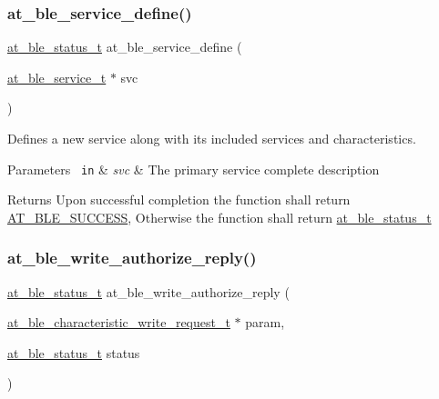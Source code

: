 \subsubsection{\texorpdfstring{at\_ble\_service\_define()}{at\_ble\_service\_define()}}
{\footnotesize\ttfamily \mbox{\hyperlink{group__error__codes__group_ga3b1db9b95feb157b3c188ca27fe76988}{at\+\_\+ble\+\_\+status\+\_\+t}} at\+\_\+ble\+\_\+service\+\_\+define (\begin{DoxyParamCaption}\item[{\mbox{\hyperlink{structat__ble__service__t}{at\+\_\+ble\+\_\+service\+\_\+t}} $\ast$}]{svc }\end{DoxyParamCaption})}



Defines a new service along with its included services and characteristics. 


\begin{DoxyParams}[1]{Parameters}
\mbox{\texttt{ in}}  & {\em svc} & The primary service complete description\\
\hline
\end{DoxyParams}
\begin{DoxyReturn}{Returns}
Upon successful completion the function shall return \mbox{\hyperlink{group__error__codes__group_gga3b1db9b95feb157b3c188ca27fe76988a7e3bfff5387331cd4f2c56cbcbbd7e19}{A\+T\+\_\+\+B\+L\+E\+\_\+\+S\+U\+C\+C\+E\+SS}}, Otherwise the function shall return \mbox{\hyperlink{at__ble__api_8h_ace24eb4e5ca3f325c663b809da5feb92}{at\+\_\+ble\+\_\+status\+\_\+t}} 
\end{DoxyReturn}
\mbox{\label{group__gatt__server__group_gaf68dba9223f2fd2828ec74ce9a9f9f8e}} 
\subsubsection{\texorpdfstring{at\_ble\_write\_authorize\_reply()}{at\_ble\_write\_authorize\_reply()}}
{\footnotesize\ttfamily \mbox{\hyperlink{group__error__codes__group_ga3b1db9b95feb157b3c188ca27fe76988}{at\+\_\+ble\+\_\+status\+\_\+t}} at\+\_\+ble\+\_\+write\+\_\+authorize\+\_\+reply (\begin{DoxyParamCaption}\item[{\mbox{\hyperlink{structat__ble__characteristic__write__request__t}{at\+\_\+ble\+\_\+characteristic\+\_\+write\+\_\+request\+\_\+t}} $\ast$}]{param,  }\item[{\mbox{\hyperlink{group__error__codes__group_ga3b1db9b95feb157b3c188ca27fe76988}{at\+\_\+ble\+\_\+status\+\_\+t}}}]{status }\end{DoxyParamCaption})}



